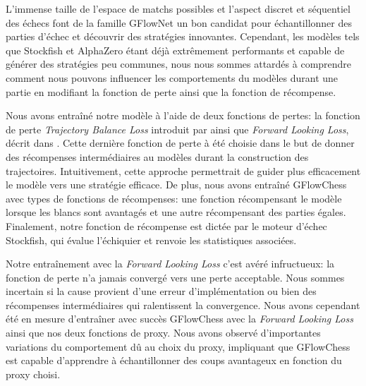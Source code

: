 \documentclass[11pt]{article}
\begin{document}
L'immense taille de l'espace de matchs possibles et l'aspect discret
et séquentiel des échecs font de la famille GFlowNet un bon candidat
pour échantillonner des parties d'échec et découvrir des stratégies
innovantes. Cependant, les modèles tels que Stockfish et AlphaZero
étant déjà extrêmement performants et capable de générer des
stratégies peu communes, nous nous sommes attardés à comprendre
comment nous pouvons influencer les comportements du modèles durant
une partie en modifiant la fonction de perte ainsi que la fonction de
récompense.

Nous avons entraîné notre modèle à l'aide de deux fonctions de pertes:
la fonction de perte \textit{Trajectory Balance Loss} introduit par
\citet{TBLoss} ainsi que \textit{Forward Looking Loss}, décrit dans
\citet{FLLoss}. Cette dernière fonction de perte à été choisie dans le
but de donner des récompenses intermédiaires au modèles durant la
construction des trajectoires. Intuitivement, cette approche
permettrait de guider plus efficacement le modèle vers une stratégie
efficace. De plus, nous avons entraîné GFlowChess avec types de
fonctions de récompenses: une fonction récompensant le modèle lorsque
les blancs sont avantagés et une autre récompensant des parties
égales. Finalement, notre fonction de récompense est dictée par le
moteur d'échec Stockfish, qui évalue l'échiquier et renvoie les
statistiques associées.

Notre entraînement avec la \textit{Forward Looking Loss} c'est avéré
infructueux: la fonction de perte n'a jamais convergé vers une perte
acceptable. Nous sommes incertain si la cause provient d'une erreur
d'implémentation ou bien des récompenses intermédiaires qui
ralentissent la convergence. Nous avons cependant été en mesure
d'entraîner avec succès GFlowChess avec la \textit{Forward Looking
  Loss} ainsi que nos deux fonctions de proxy. Nous avons observé
d'importantes variations du comportement dû au choix du proxy,
impliquant que GFlowChess est capable d'apprendre à échantillonner des
coups avantageux en fonction du proxy choisi.
\end{document}
